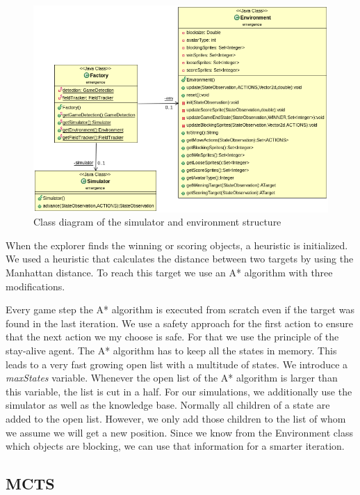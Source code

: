 \begin{figure}
\centering
\includegraphics[scale=0.5]{images/classes.png}
\caption{Class diagram of the simulator and environment structure}
\label{fig:sim_classes}
\end{figure}


When the explorer finds the winning or scoring objects, a heuristic is initialized. We used a heuristic that 
calculates the distance between two targets by using the Manhattan distance. To reach this target we use an A* 
algorithm with three modifications.

Every game step the A* algorithm is executed from scratch even if the target was found in the last iteration.
We use a safety approach for the first action to ensure that the next action we my choose is safe. For that we
use the principle of the stay-alive agent. The A* algorithm has to keep all the states in memory.
This leads to a very fast growing open list with a multitude of states. We introduce a \textit{maxStates} variable. 
Whenever the open list of the A* algorithm is larger than this variable, the list is cut in a half.
For our simulations, we additionally use the simulator as well as the knowledge base. Normally all children of
a state are added to the open list. However, we only add those children to the list of whom we assume we will get a new position. Since we know from the Environment class which objects are blocking, we can use that information
for a smarter iteration.


\subsection{MCTS} 

